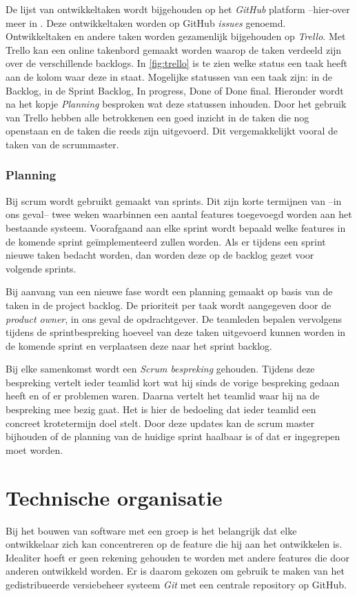 De lijst van ontwikkeltaken wordt bijgehouden op het \emph{GitHub} platform --{hier-over} meer in . Deze ontwikkeltaken worden op GitHub \emph{issues} genoemd. Ontwikkeltaken en andere taken worden gezamenlijk bijgehouden op \emph{Trello}. Met Trello kan een online takenbord gemaakt worden waarop de taken verdeeld zijn over de verschillende backlogs. In \autoref{fig:trello} is te zien welke status een taak heeft aan de kolom waar deze in staat. Mogelijke statussen van een taak zijn: in de Backlog, in de Sprint Backlog, In progress, Done of Done final. Hieronder wordt na het kopje \emph{Planning} besproken wat deze statussen inhouden. Door het gebruik van Trello hebben alle betrokkenen een goed inzicht in de taken die nog openstaan en de taken die reeds zijn uitgevoerd. Dit vergemakkelijkt vooral de taken van de scrummaster.

\subsubsection{Planning}
Bij scrum wordt gebruikt gemaakt van sprints. Dit zijn korte termijnen van --in ons geval-- twee weken waarbinnen een aantal features toegevoegd worden aan het bestaande systeem. Voorafgaand aan elke sprint wordt bepaald welke features in de komende sprint geïmplementeerd zullen worden. Als er tijdens een sprint nieuwe taken bedacht worden, dan worden deze op de backlog gezet voor volgende sprints.

Bij aanvang van een nieuwe fase wordt een planning gemaakt op basis van de taken in de project backlog. De prioriteit per taak wordt aangegeven door de \emph{product owner}, in ons geval de opdrachtgever. De teamleden bepalen vervolgens tijdens de sprintbespreking hoeveel van deze taken uitgevoerd kunnen worden in de komende sprint en verplaatsen deze naar het sprint backlog.

Bij elke samenkomst wordt een \emph{Scrum bespreking} gehouden. Tijdens deze bespreking vertelt ieder teamlid kort wat hij sinds de vorige bespreking gedaan heeft en of er problemen waren. Daarna vertelt het teamlid waar hij na de bespreking mee bezig gaat. Het is hier de bedoeling dat ieder teamlid een concreet krotetermijn doel stelt. Door deze updates kan de scrum master bijhouden of de planning van de huidige sprint haalbaar is of dat er ingegrepen moet worden.

\section{Technische organisatie} \label{sec:technische_organisatie}
Bij het bouwen van software met een groep is het belangrijk dat elke ontwikkelaar zich kan concentreren op de feature die hij aan het ontwikkelen is. Idealiter hoeft er geen rekening gehouden te worden met andere features die door anderen ontwikkeld worden. Er is daarom gekozen om gebruik te maken van het gedistribueerde versiebeheer systeem \emph{Git} met een centrale repository op GitHub.

